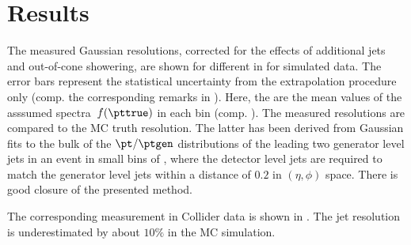 \section{Results}

The measured Gaussian resolutions, corrected for the effects of
additional jets and out-of-cone showering, are shown for different
\ptref in  for simulated
data.
The error bars represent the statistical uncertainty from the
extrapolation procedure only (comp. the corresponding remarks in
).
Here, the \ptref are the mean values of the asssumed spectra~$f(\pttrue)$
in each \ptave bin (comp. ).
The measured resolutions are compared to the MC truth resolution.
The latter has been derived from Gaussian fits to the bulk of the
\mbox{$\pt / \ptgen$} distributions of the leading two generator
level jets in an event in small bins of \ptgen, where the
detector level jets are required to match the generator level jets
within a distance of $0.2$ in \mbox{$(\eta,\phi)$} space.
There is good closure of the presented method.

The corresponding measurement in Collider data is shown in .
The jet \pt resolution is underestimated by about $10\%$ in the MC simulation.

